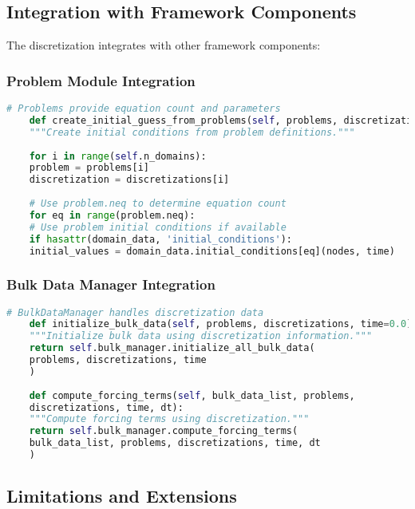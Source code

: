 \subsection{Integration with Framework Components}
\label{subsec:framework_integration}

The discretization integrates with other framework components:

\subsubsection{Problem Module Integration}

\begin{lstlisting}[language=Python, caption=Problem-Discretization Interface]
	# Problems provide equation count and parameters
	def create_initial_guess_from_problems(self, problems, discretizations, time=0.0):
	"""Create initial conditions from problem definitions."""
	
	for i in range(self.n_domains):
	problem = problems[i]
	discretization = discretizations[i]
	
	# Use problem.neq to determine equation count
	for eq in range(problem.neq):
	# Use problem initial conditions if available
	if hasattr(domain_data, 'initial_conditions'):
	initial_values = domain_data.initial_conditions[eq](nodes, time)
\end{lstlisting}

\subsubsection{Bulk Data Manager Integration}

\begin{lstlisting}[language=Python, caption=Bulk Data Integration]
	# BulkDataManager handles discretization data
	def initialize_bulk_data(self, problems, discretizations, time=0.0):
	"""Initialize bulk data using discretization information."""
	return self.bulk_manager.initialize_all_bulk_data(
	problems, discretizations, time
	)
	
	def compute_forcing_terms(self, bulk_data_list, problems, 
	discretizations, time, dt):
	"""Compute forcing terms using discretization."""
	return self.bulk_manager.compute_forcing_terms(
	bulk_data_list, problems, discretizations, time, dt
	)
\end{lstlisting}

\subsection{Limitations and Extensions}
\label{subsec:limitations}

